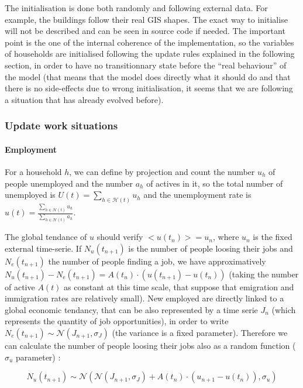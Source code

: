 \documentclass[english]{article}
\begin{document}
The initialisation is done both randomly and following external data.
For example, the buildings follow their real GIS shapes. The exact
way to initialise will not be described and can be seen in source
code if needed. The important point is the one of the internal coherence
of the implementation, so the variables of households are initialised
following the update rules explained in the following section, in order to
have no transitionnary state before the ``real behaviour'' of the
model (that means that the model does directly what it should do and
that there is no side-effects due to wrong initialisation, it seems that
we are following a situation that has already evolved before).


\subsubsection{Update work situations}


\paragraph{Employment}

For a household $h$, we can define by projection and count the
number $u_{h}$ of people unemployed and the number $a_{h}$ of actives
in it, so the total number of unemployed is $U(t)=\sum_{h\in\mathcal{H}(t)}u_{h}$
and the unemployment rate is $u(t)=\frac{\sum_{h\in\mathcal{H}(t)}u_{h}}{\sum_{h\in\mathcal{H}(t)}a_{h}}$.

The global tendance of $u$ should verify $<u(t_{n})>=u_{n}$, where
$u_{n}$ is the fixed external time-serie. If $N_{u}(t_{n+1})$ is
the number of people loosing their jobs and $N_{e}(t_{n+1})$ the
number of people finding a job, we have approximatively $N_{u}(t_{n+1})-N_{e}(t_{n+1})=A(t_{n})\cdot(u(t_{n+1})-u(t_{n}))$
(taking the number of active $A(t)$ as constant at this time scale,
that suppose that emigration and immigration rates are relatively
small). New employed are directly linked to a global economic tendancy,
that can be also represented by a time serie $J_{n}$ (which represents
the quantity of job opportunities), in order to write $N_{e}(t_{n+1})\sim\mathcal{N}(J_{n+1},\sigma_{J})$
(the variance is a fixed parameter). Therefore we can calculate the
number of people loosing their jobs also as a random function ($\sigma_{u}$
parameter) :

\[
N_{u}(t_{n+1})\sim\mathcal{N}(\mathcal{N}(J_{n+1},\sigma_{J})+A(t_{n})\cdot(u_{n+1}-u(t_{n})),\sigma_{u})
\]
\end{document}
